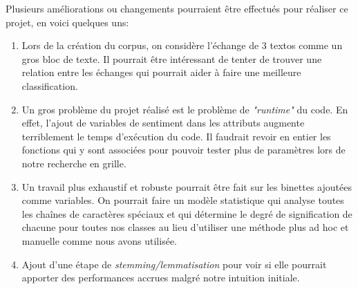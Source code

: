 Plusieurs améliorations ou changements pourraient être effectués pour réaliser ce projet, en voici quelques uns:

\begin{enumerate}
\item Lors de la création du corpus, on considère l'échange de 3 textos comme un gros bloc de texte. Il pourrait être intéressant de tenter de trouver une relation entre les échanges qui pourrait aider à faire une meilleure classification.

\item Un gros problème du projet réalisé est le problème de \emph{"runtime"} du code. En effet, l'ajout de variables de sentiment dans les attributs augmente terriblement le temps d'exécution du code. Il faudrait revoir en entier les fonctions qui y sont associées pour pouvoir tester plus de paramètres lors de notre recherche en grille.

\item Un travail plus exhaustif et robuste pourrait être fait sur les binettes ajoutées comme variables. On pourrait faire un modèle statistique qui analyse toutes les chaînes de caractères spéciaux et qui détermine le degré de signification de chacune pour toutes nos classes au lieu d'utiliser une méthode plus ad hoc et manuelle comme nous avons utilisée.

\item Ajout d'une étape de \emph{stemming/lemmatisation} pour voir si elle pourrait apporter des performances accrues malgré notre intuition initiale.
\end{enumerate}